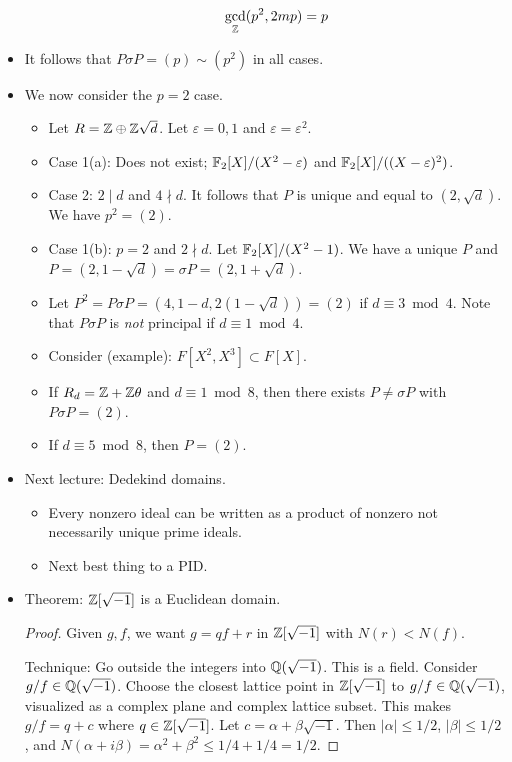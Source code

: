 \documentclass[../notes.tex]{subfiles}
\begin{document}
\begin{itemize}
\begin{itemize}
        \begin{equation*}
            \gcd_{\mathbb{Z}}(p^2,2mp) = p
        \end{equation*}
    \end{itemize}
    \item It follows that $P\sigma P=(p)\sim(p^2)$ in all cases.
    \item We now consider the $p=2$ case.
    \begin{itemize}
        \item Let $R=\mathbb{Z}\oplus\mathbb{Z}\sqrt{d}$. Let $\varepsilon=0,1$ and $\varepsilon=\varepsilon^2$.
        \item Case 1(a): Does not exist; $\mathbb{F}_2[X]/(X^2-\varepsilon)$ and $\mathbb{F}_2[X]/((X-\varepsilon)^2)$.
        \item Case 2: $2\mid d$ and $4\nmid d$. It follows that $P$ is unique and equal to $(2,\sqrt{d})$. We have $p^2=(2)$.
        \item Case 1(b): $p=2$ and $2\nmid d$. Let $\mathbb{F}_2[X]/(X^2-1)$. We have a unique $P$ and $P=(2,1-\sqrt{d})=\sigma P=(2,1+\sqrt{d})$.
        \item Let $P^2=P\sigma P=(4,1-d,2(1-\sqrt{d}))=(2)$ if $d\equiv 3\bmod 4$. Note that $P\sigma P$ is \emph{not} principal if $d\equiv 1\bmod 4$.
        \item Consider (example): $F[X^2,X^3]\subset F[X]$.
        \item If $R_d=\mathbb{Z}+\mathbb{Z}\theta$ and $d\equiv 1\bmod 8$, then there exists $P\neq\sigma P$ with $P\sigma P=(2)$.
        \item If $d\equiv 5\bmod 8$, then $P=(2)$.
    \end{itemize}
    \item Next lecture: Dedekind domains.
    \begin{itemize}
        \item Every nonzero ideal can be written as a product of nonzero not necessarily unique prime ideals.
        \item Next best thing to a PID.
    \end{itemize}
    \item Theorem: $\mathbb{Z}[\sqrt{-1}]$ is a Euclidean domain.
    \begin{proof}
        Given $g,f$, we want $g=qf+r$ in $\mathbb{Z}[\sqrt{-1}]$ with $N(r)<N(f)$.\par
        Technique: Go outside the integers into $\mathbb{Q}(\sqrt{-1})$. This is a field. Consider $g/f\in\mathbb{Q}(\sqrt{-1})$. Choose the closest lattice point in $\mathbb{Z}[\sqrt{-1}]$ to $g/f\in\mathbb{Q}(\sqrt{-1})$, visualized as a complex plane and complex lattice subset. This makes $g/f=q+c$ where $q\in\mathbb{Z}[\sqrt{-1}]$. Let $c=\alpha+\beta\sqrt{-1}$. Then $|\alpha|\leq 1/2$, $|\beta|\leq 1/2$, and $N(\alpha+i\beta)=\alpha^2+\beta^2\leq 1/4+1/4=1/2$.\par

\end{proof}
\end{itemize}
\end{document}
